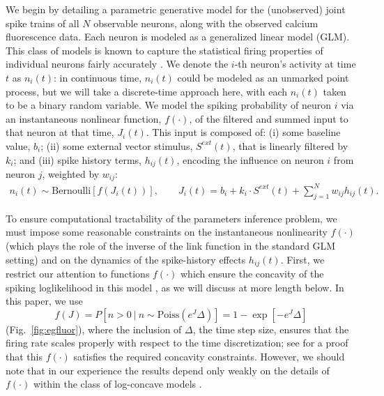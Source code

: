 \documentclass[aoas,preprint]{imsart}
\newcommand{\w}{w}
\begin{document}
We begin by detailing a parametric generative model for the (unobserved) joint spike trains of all $N$ observable neurons, along with the observed calcium fluorescence data. Each neuron is modeled as a generalized linear model (GLM). This class of models is known to capture the statistical firing properties of individual neurons fairly accurately \cite{BRIL88,CSK88,BRIL92,PG00,PILL07,PAN03d,PAN04c,Rigat06,TRUC05,NYK06,KP06,Vidne08,Stevenson2009}. We denote the $i$-th neuron's activity at time $t$ as $n_i(t)$: in continuous time, $n_i(t)$ could be modeled as an unmarked point process, but we will take a discrete-time approach here, with each $n_i(t)$ taken to be a binary random variable. We model the spiking probability of neuron $i$ via an instantaneous nonlinear function, $f(\cdot)$, of the filtered and summed input to that neuron at that time, $J_i(t)$. This input is composed of: (i) some baseline value, $b_i$; (ii) some external vector stimulus, $S^{ext}(t)$, that is linearly filtered by $k_i$; and (iii) spike history terms, $h_{ij}(t)$, encoding the influence on neuron $i$ from neuron $j$, weighted by $\w_{ij}$:
\begin{equation} \label{eqn:glm:definition}
\begin{array}{l}
n_i(t) \sim \text{Bernoulli}\left[f\left(J_i(t) \right) \right], \qquad
J_i(t)=b_i+k_i\cdot S^{ext}(t)+\sum \limits_{j=1}^{N} \w_{ij} h_{ij}(t).
\end{array}
\end{equation}

To ensure computational tractability of the parameters inference problem, we must impose some reasonable constraints on the instantaneous nonlinearity $f(\cdot)$ (which plays the role of the inverse of the link function in the standard GLM setting) and on the dynamics of the spike-history effects $h_{ij}(t)$. First, we restrict our attention to functions $f(\cdot)$ which ensure the concavity of the spiking loglikelihood in this model \cite{PAN04c,Escola07}, as we will discuss at more length below. In this paper, we use
\begin{equation}
f(J) = P\left[n>0 ~|~ n \sim \text{Poiss}\left(e^J\Delta\right)\right] = 1 - \exp[-e^J \Delta]
\end{equation}
(Fig.~\ref{fig:egfluor}), where the inclusion of $\Delta$, the time step size, ensures that the firing rate scales properly with respect to the time discretization; see \cite{Escola07} for a proof that this $f(\cdot)$ satisfies the required concavity constraints. However, we should note that in our experience the results depend only weakly on the details of $f(\cdot)$ within the class of log-concave models \cite{LD89,PAN04c}.
\end{document}
